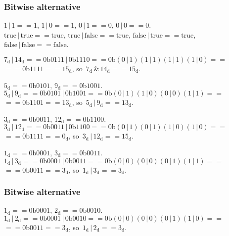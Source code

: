\documentclass[10pt,t]{beamer}
\begin{document}
\begin{frame}
  \frametitle{Bitwise alternative}

  $1 \, | \, 1 == 1$, $1 \, | \, 0 == 1$, $0 \, | \, 1 == 0$,
  $0 \, | \, 0 == 0$. \\
  $\text{true} \, | \, \text{true} == \text{true}$,
  $\text{true} \, | \, \text{false} == \text{true}$,
  $\text{false} \, | \, \text{true} == \text{true}$, \\
  $\text{false} \, | \, \text{false} == \text{false}$.

  $7_{ \text{d} } \, | \, 14_{ \text{d} } == 0\text{b}0111 \, | \,
  0\text{b}1110 ==
  0\text{b}( 0 \, | \, 1 )( 1 \, | \, 1 )( 1 \, | \, 1 )
  ( 1 \, | \, 0 ) ==$ \\
  $== 0\text{b}1111 == 15_{ \text{d} }$,
  so~$7_{ \text{d} } \, \& \, 14_{ \text{d} } == 15_{ \text{d} }$.

  $5_{ \text{d} } == 0\text{b}0101$, $9_{ \text{d} } == 0\text{b}1001$. \\
  $5_{ \text{d} } \, | \, 9_{ \text{d} } == 0\text{b}0101 \, | \,
  0\text{b}1001 == 0\text{b}( 0 \, | \, 1 )( 1 \, | \, 0 )
  ( 0 \, | \, 0 )( 1 \, | \, 1 ) ==$ \\
  $== 0\text{b}1101 == 13_{ \text{d} }$,
  so~$5_{ \text{d} } \, | \, 9_{ \text{d} } == 13_{ \text{d} }$.

  $3_{ \text{d} } == 0\text{b}0011$, $12_{ \text{d} } == 0\text{b}1100$. \\
  $3_{ \text{d} } \, | \, 12_{ \text{d} } == 0\text{b}0011 \, | \,
  0\text{b}1100 == 0\text{b}( 0 \, | \, 1 )( 0 \, | \, 1 )
  ( 1 \, | \, 0 )( 1 \, | \, 0 ) ==$ \\
  $== 0\text{b}1111 == 0_{ \text{d} }$,
  so~$3_{ \text{d} } \, | \, 12_{ \text{d} } == 15_{ \text{d} }$.

  $1_{ \text{d} } == 0\text{b}0001$, $3_{ \text{d} } == 0\text{b}0011$. \\
  $1_{ \text{d} } \, | \, 3_{ \text{d} } == 0\text{b}0001 \, | \,
  0\text{b}0011 == 0\text{b}( 0 \, | \, 0 )( 0 \, | \, 0 )
  ( 0 \, | \, 1 )( 1 \, | \, 1 ) ==$ \\
  $== 0\text{b}0011 == 3_{ \text{d} }$,
  so~$1_{ \text{d} } \, | \, 3_{ \text{d} } == 3_{ \text{d} }$.

\end{frame}





\begin{frame}
  \frametitle{Bitwise alternative}



  $1_{ \text{d} } == 0\text{b}0001$, $2_{ \text{d} } == 0\text{b}0010$. \\
  $1_{ \text{d} } \, | \, 2_{ \text{d} } == 0\text{b}0001 \, | \,
  0\text{b}0010 == 0\text{b}( 0 \, | \, 0 )( 0 \, | \, 0 )
  ( 0 \, | \, 1 )( 1 \, | \, 0 ) ==$ \\
  $== 0\text{b}0011 == 3_{ \text{d} }$,
  so~$1_{ \text{d} } \, | \, 2_{ \text{d} } == 3_{ \text{d} }$.

\end{frame}
\end{document}
